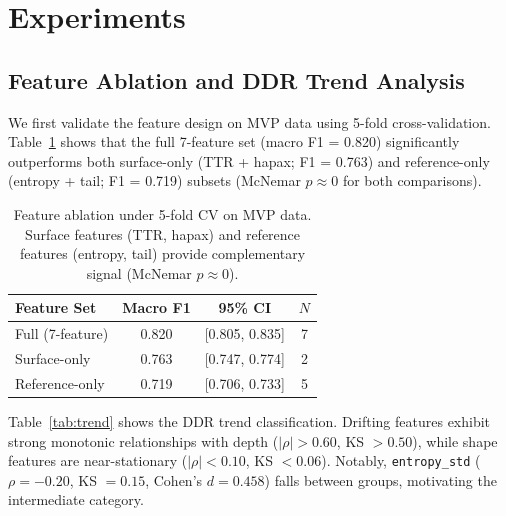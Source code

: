 \documentclass[11pt,a4paper]{article}
\begin{document}
\section{Experiments}

\subsection{Feature Ablation and DDR Trend Analysis}
\label{sec:ablation}

We first validate the feature design on MVP data using 5-fold cross-validation.
Table~\ref{tab:ablation} shows that the full 7-feature set (macro F1 = 0.820) significantly outperforms both surface-only (TTR + hapax; F1 = 0.763) and reference-only (entropy + tail; F1 = 0.719) subsets (McNemar $p \approx 0$ for both comparisons).

\begin{table}[t]
\centering
\small
\begin{tabular}{lccc}
\toprule
\textbf{Feature Set} & \textbf{Macro F1} & \textbf{95\% CI} & \textbf{$N$} \\
\midrule
Full (7-feature) & 0.820 & [0.805, 0.835] & 7 \\
Surface-only & 0.763 & [0.747, 0.774] & 2 \\
Reference-only & 0.719 & [0.706, 0.733] & 5 \\
\bottomrule
\end{tabular}
\caption{Feature ablation under 5-fold CV on MVP data. Surface features (TTR, hapax) and reference features (entropy, tail) provide complementary signal (McNemar $p \approx 0$).}
\label{tab:ablation}
\end{table}

Table~\ref{tab:trend} shows the DDR trend classification.
Drifting features exhibit strong monotonic relationships with depth ($|\rho| > 0.60$, KS $> 0.50$), while shape features are near-stationary ($|\rho| < 0.10$, KS $< 0.06$).
Notably, \texttt{entropy\_std} ($\rho = -0.20$, KS $= 0.15$, Cohen's $d = 0.458$) falls between groups, motivating the intermediate category.
\end{document}
